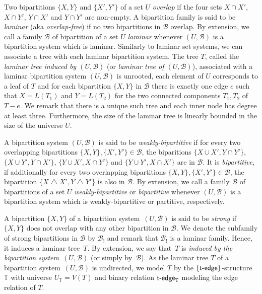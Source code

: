 \documentclass{lmcs} %
\newcommand*\defd[2][\em\color{red!25!black}]{{#1#2}}
\DeclareMathOperator*\symdiff{\bigtriangleup}
\newcommand{\tedge}{\ensuremath{\mathsf{t}\text-\mathsf{edge}}\xspace}
\begin{document}
Two bipartitions $\{X,Y\}$ and $\{X',Y'\}$ of a set $U$ \emph{overlap} if the four sets $X\cap X'$, $X\cap Y'$, $Y\cap X'$ and $Y\cap Y'$ are non-empty.
A bipartition family is said to be \emph{laminar} (aka \emph{overlap-free})
if no two bipartitions in $\mathcal{B}$ overlap.
By extension, we call a family $\mathcal{B}$ of bipartition of a set $U$ \emph{laminar}
whenever $(U,\mathcal{B})$ is a bipartition system which is laminar.
Similarly to laminar set systems, we can associate a tree with each laminar bipartition system. The tree $T$, called the \emph{laminar tree induced by $(U,\mathcal{B})$} (or \emph{laminar tree of $(U,\mathcal{B})$}), associated with a laminar bipartition system $(U,\mathcal{B})$ is unrooted, each element of $U$ corresponds to a leaf of $T$ and for each bipartition $\{X,Y\}$ in $\mathcal{B}$ there is exactly one edge $e$ such that $X=L(T_1)$ and $Y=L(T_2)$ for the two connected components $T_1,T_2$ of $T-e$. We remark that there is a unique such tree and each inner node has degree at least three.
Furthermore, the size of the laminar tree is linearly bounded in the size of the universe $U$.


A bipartition system $(U,\mathcal{B})$ is said to be \emph{weakly-bipartitive} if for every two overlapping bipartitions $\{X,Y\},\{X',Y'\}\in \mathcal{B}$, the biparitions $\{X\cup X',Y\cap Y'\}$, $\{X\cup Y',Y\cap X'\}$, $\{Y\cup X', X\cap Y'\}$ and $\{Y\cup Y', X\cap X'\}$ are in $\mathcal{B}$.
It is \emph{bipartitive}, if additionally for every two overlapping bipartitions $\{X,Y\},\{X',Y'\}\in \mathcal{B}$,
the bipartition $\{X\symdiff X', Y\symdiff Y'\}$ is also in $\mathcal{B}$.
By extension, we call a family $\mathcal{B}$ of bipartitions of a set $U$ \emph{weakly-bipartitive} or \emph{bipartitive} whenever $(U,\mathcal{B})$ is a bipartition system which is weakly-bipartitive or partitive, respectively.

A bipartition $\{X,Y\}$ of a bipartition system~$(U,\mathcal{B})$ is said to be \emph{strong} if $\{X,Y\}$ does not overlap with any other bipartition in $\mathcal{B}$. We denote the subfamily of strong bipartitions in $\mathcal{B}$ by $\mathcal{B}_!$ and remark that $\mathcal{B}_!$ is a laminar family.
Hence, it induces a laminar tree~$T$.
By extension,
we say that~$T$ is \defd{induced by the bipartition system~$(U,\mathcal{B})$} (or simply by~$\mathcal{B}$).
As the laminar tree $T$ of a bipartition system~$(U,\mathcal{B})$ is undirected, we model $T$ by the $\{\tedge\}$-structure $\mathbb{T}$ with universe $U_\mathbb{T}=V(T)$ and binary relation $\tedge_\mathbb{T}$ modeling the edge relation of $T$.
\end{document}
